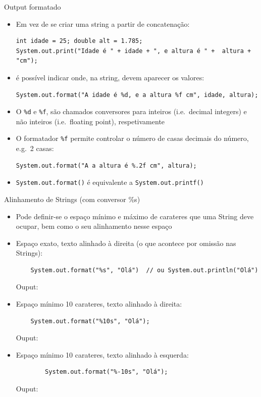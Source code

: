 \documentclass[portuguese, aspectratio=169, xcolor=table]{beamer}
\begin{document}
\begin{frame}[fragile]{Output formatado}
\begin{itemize}
    \item Em vez de se criar uma string a partir de concatenação:
\begin{verbatim}
int idade = 25; double alt = 1.785;
System.out.print("Idade é " + idade + ", e altura é " +  altura + "cm");
\end{verbatim}
\item é possível indicar onde, na string, devem aparecer os valores:
\begin{verbatim}
System.out.format("A idade é %d, e a altura %f cm", idade, altura);
\end{verbatim}

\item O \texttt{\%d} e \texttt{\%f}, são chamados conversores para inteiros (i.e.\ decimal integers) e não inteiros (i.e.\ floating point), respetivamente

\item O formatador \texttt{\%f} permite controlar o número de casas decimais do número, e.g.\ 2 casas:
\begin{verbatim}
System.out.format("A a altura é %.2f cm", altura);
\end{verbatim}

\item \texttt{System.out.format()} é equivalente a \texttt{System.out.printf()}
\end{itemize}
\end{frame}


\begin{frame}[fragile]{Alinhamento de Strings (com conversor {\color{red}\%s})}
\begin{itemize}
    \item Pode definir-se o espaço mínimo e máximo de carateres que uma String deve ocupar, bem como o seu alinhamento nesse espaço
    \item Espaço exato, texto alinhado à direita (o que acontece por omissão nas Strings):
    \begin{verbatim}
    System.out.format("%s", "Olá")  // ou System.out.println("Olá")
    \end{verbatim}
    Ouput: 
    \item Espaço mínimo 10 carateres, texto alinhado à direita:
    \begin{verbatim}
    System.out.format("%10s", "Olá");
    \end{verbatim}
    Ouput: 
    \item Espaço mínimo 10 carateres, texto alinhado à esquerda:
    \begin{verbatim}
        System.out.format("%-10s", "Olá");
    \end{verbatim}
    Ouput: 
\end{itemize}
\end{frame}
\end{document}
